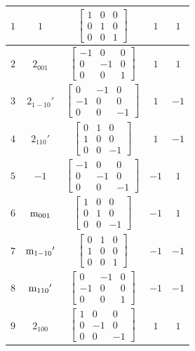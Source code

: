 \documentclass[fleqn,8pt]{jsarticle}
\begin{document}
\begin{longtable}{ccccc}
$ 1 $ & $ 1 $ & $ \begin{bmatrix} 1 & 0 & 0 \\ 0 & 1 & 0 \\ 0 & 0 & 1 \end{bmatrix} $ & $ 1 $ & $ 1 $ \\ \hline
$ 2 $ & $ 2{}_{001} $ & $ \begin{bmatrix} -1 & 0 & 0 \\ 0 & -1 & 0 \\ 0 & 0 & 1 \end{bmatrix} $ & $ 1 $ & $ 1 $ \\ \hline
$ 3 $ & $ 2{}_{1-10}{}' $ & $ \begin{bmatrix} 0 & -1 & 0 \\ -1 & 0 & 0 \\ 0 & 0 & -1 \end{bmatrix} $ & $ 1 $ & $ -1 $ \\ \hline
$ 4 $ & $ 2{}_{110}{}' $ & $ \begin{bmatrix} 0 & 1 & 0 \\ 1 & 0 & 0 \\ 0 & 0 & -1 \end{bmatrix} $ & $ 1 $ & $ -1 $ \\ \hline
$ 5 $ & $ -1 $ & $ \begin{bmatrix} -1 & 0 & 0 \\ 0 & -1 & 0 \\ 0 & 0 & -1 \end{bmatrix} $ & $ -1 $ & $ 1 $ \\ \hline
$ 6 $ & $ {\rm m}_{001} $ & $ \begin{bmatrix} 1 & 0 & 0 \\ 0 & 1 & 0 \\ 0 & 0 & -1 \end{bmatrix} $ & $ -1 $ & $ 1 $ \\ \hline
$ 7 $ & $ {\rm m}_{1-10}{}' $ & $ \begin{bmatrix} 0 & 1 & 0 \\ 1 & 0 & 0 \\ 0 & 0 & 1 \end{bmatrix} $ & $ -1 $ & $ -1 $ \\ \hline
$ 8 $ & $ {\rm m}_{110}{}' $ & $ \begin{bmatrix} 0 & -1 & 0 \\ -1 & 0 & 0 \\ 0 & 0 & 1 \end{bmatrix} $ & $ -1 $ & $ -1 $ \\ \hline
$ 9 $ & $ 2{}_{100} $ & $ \begin{bmatrix} 1 & 0 & 0 \\ 0 & -1 & 0 \\ 0 & 0 & -1 \end{bmatrix} $ & $ 1 $ & $ 1 $ \\ \hline

\end{longtable}
\end{document}
